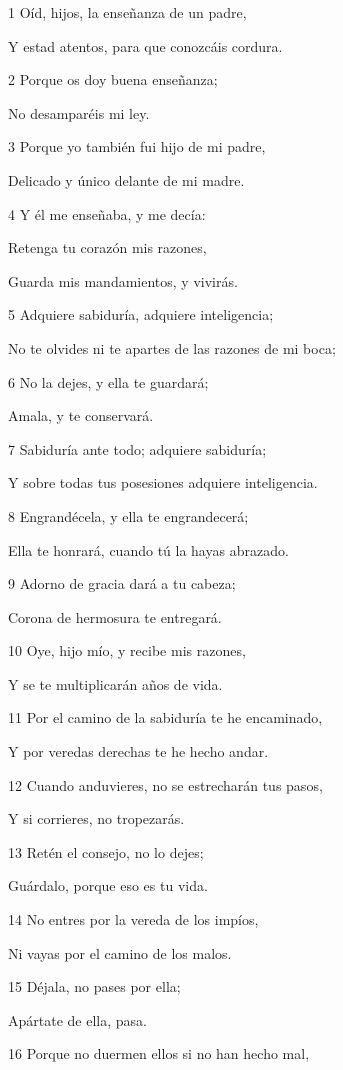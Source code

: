 \par 1 Oíd, hijos, la enseñanza de un padre,
\par Y estad atentos, para que conozcáis cordura.
\par 2 Porque os doy buena enseñanza;
\par No desamparéis mi ley.
\par 3 Porque yo también fui hijo de mi padre,
\par Delicado y único delante de mi madre.
\par 4 Y él me enseñaba, y me decía:
\par Retenga tu corazón mis razones,
\par Guarda mis mandamientos, y vivirás.
\par 5 Adquiere sabiduría, adquiere inteligencia;
\par No te olvides ni te apartes de las razones de mi boca;
\par 6 No la dejes, y ella te guardará;
\par Amala, y te conservará.
\par 7 Sabiduría ante todo; adquiere sabiduría;
\par Y sobre todas tus posesiones adquiere inteligencia.
\par 8 Engrandécela, y ella te engrandecerá;
\par Ella te honrará, cuando tú la hayas abrazado.
\par 9 Adorno de gracia dará a tu cabeza;
\par Corona de hermosura te entregará.
\par 10 Oye, hijo mío, y recibe mis razones,
\par Y se te multiplicarán años de vida.
\par 11 Por el camino de la sabiduría te he encaminado,
\par Y por veredas derechas te he hecho andar.
\par 12 Cuando anduvieres, no se estrecharán tus pasos,
\par Y si corrieres, no tropezarás.
\par 13 Retén el consejo, no lo dejes;
\par Guárdalo, porque eso es tu vida.
\par 14 No entres por la vereda de los impíos,
\par Ni vayas por el camino de los malos.
\par 15 Déjala, no pases por ella;
\par Apártate de ella, pasa.
\par 16 Porque no duermen ellos si no han hecho mal,
